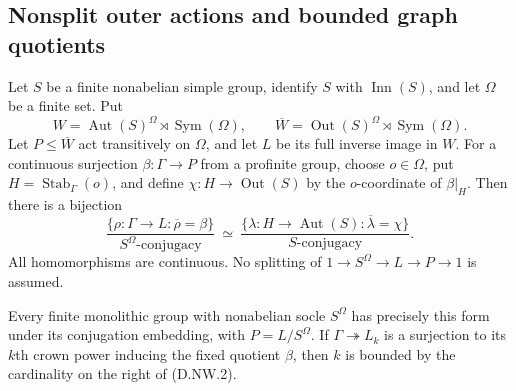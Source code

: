 \subsection{Nonsplit outer actions and bounded graph quotients}

\begin{lemma}
\label{D:nonsplit-automorphism-wreath-lifts}
Let $S$ be a finite nonabelian simple group, identify $S$
with $\operatorname{Inn}(S)$, and let $\Omega$ be a finite
set. Put
\[
 W=\operatorname{Aut}(S)^\Omega\rtimes\operatorname{Sym}(\Omega),
 \qquad
 \overline W=\operatorname{Out}(S)^\Omega\rtimes
                                  \operatorname{Sym}(\Omega).
                                                        \tag{D.NW.1}
\]
Let $P\leq\overline W$ act transitively on $\Omega$,
and let $L$ be its full inverse image in $W$.
For a continuous surjection $\beta:\Gamma\to P$ from
a profinite group, choose $o\in\Omega$, put
$H=\operatorname{Stab}_\Gamma(o)$, and define
$\chi:H\to\operatorname{Out}(S)$ by the $o$-coordinate
of $\beta|_H$. Then there is a bijection
\[
 \frac{\{\rho:\Gamma\to L:\overline\rho=\beta\}}
            {S^\Omega\text{-conjugacy}}
 \ \simeq\
 \frac{\{\lambda:H\to\operatorname{Aut}(S):
                         \overline\lambda=\chi\}}
            {S\text{-conjugacy}}.                     \tag{D.NW.2}
\]
All homomorphisms are continuous. No splitting of
$1\to S^\Omega\to L\to P\to1$ is assumed.

Every finite monolithic group with nonabelian socle
$S^\Omega$ has precisely this form under its conjugation
embedding, with $P=L/S^\Omega$. If
$\Gamma\twoheadrightarrow L_k$ is a surjection to its
$k$th crown power inducing the fixed quotient $\beta$,
then $k$ is bounded by the cardinality on the right of
(D.NW.2).
\end{lemma}

